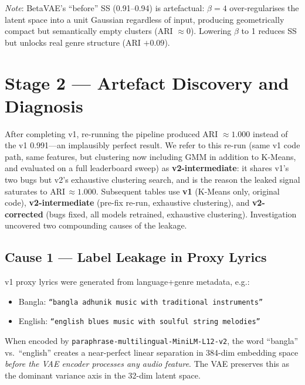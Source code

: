 \documentclass{article}
\begin{document}
\textit{Note}: BetaVAE's ``before'' SS (0.91--0.94) is artefactual: $\beta\!=\!4$
over-regularises the latent space into a unit Gaussian regardless of input, producing
geometrically compact but semantically empty clusters (ARI $\approx 0$). Lowering
$\beta$ to 1 reduces SS but unlocks real genre structure (ARI $+0.09$).

\section{Stage 2 --- Artefact Discovery and Diagnosis}
\label{sec:stage2}

After completing v1, re-running the pipeline produced ARI $\approx 1.000$ instead of
the v1 0.991---an implausibly perfect result. We refer to this re-run (same v1 code
path, same features, but clustering now including GMM in addition to K-Means, and
evaluated on a full leaderboard sweep) as \textbf{v2-intermediate}: it shares v1's
two bugs but v2's exhaustive clustering search, and is the reason the leaked signal
saturates to ARI\,$\approx\!1.000$. Subsequent tables use \textbf{v1} (K-Means only,
original code), \textbf{v2-intermediate} (pre-fix re-run, exhaustive clustering),
and \textbf{v2-corrected} (bugs fixed, all models retrained, exhaustive clustering).
Investigation uncovered two compounding causes of the leakage.

\subsection{Cause 1 --- Label Leakage in Proxy Lyrics}

v1 proxy lyrics were generated from language+genre metadata, e.g.:
\begin{itemize}
    \item Bangla: \texttt{``bangla adhunik music with traditional instruments''}
    \item English: \texttt{``english blues music with soulful string melodies''}
\end{itemize}

When encoded by \texttt{paraphrase-multilingual-MiniLM-L12-v2}, the word ``bangla''
vs.\ ``english'' creates a near-perfect linear separation in 384-dim embedding space
\emph{before the VAE encoder processes any audio feature}. The VAE preserves this as
the dominant variance axis in the 32-dim latent space.
\end{document}
